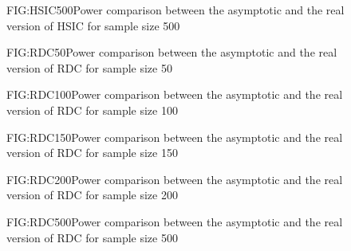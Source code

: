 \begin{figure}[HSIC asymptotic size 500]{FIG:HSIC500}{Power comparison between the asymptotic and the real version of HSIC for sample size 500}
\end{figure}
\begin{figure}[RDC asymptotic size 50]{FIG:RDC50}{Power comparison between the asymptotic and the real version of RDC for sample size 50}
\end{figure}
\begin{figure}[RDC asymptotic size 100]{FIG:RDC100}{Power comparison between the asymptotic and the real version of RDC for sample size 100}
\end{figure}
\begin{figure}[RDC asymptotic size 150]{FIG:RDC150}{Power comparison between the asymptotic and the real version of RDC for sample size 150}
\end{figure}
\begin{figure}[RDC asymptotic size 200]{FIG:RDC200}{Power comparison between the asymptotic and the real version of RDC for sample size 200}
\end{figure}
\begin{figure}[RDC asymptotic size 500]{FIG:RDC500}{Power comparison between the asymptotic and the real version of RDC for sample size 500}
\end{figure}



